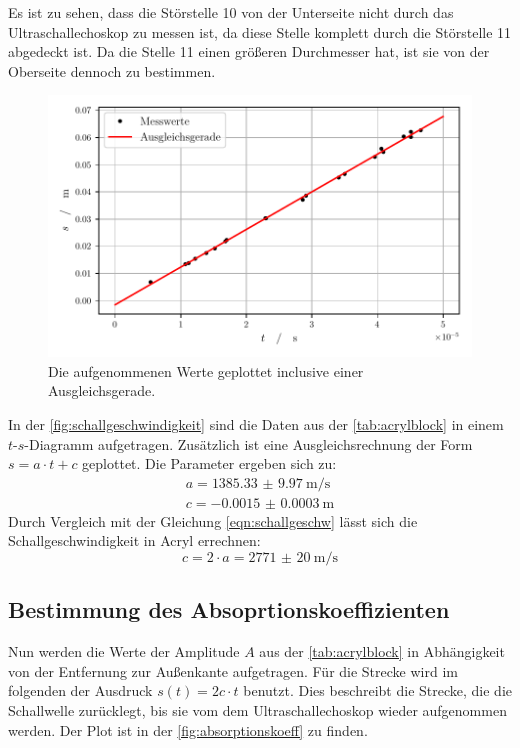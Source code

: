   \noindent Es ist zu sehen, dass die Störstelle 10 von der Unterseite nicht durch das Ultraschallechoskop zu messen ist, da diese Stelle komplett durch die 
  Störstelle 11 abgedeckt ist. Da die Stelle 11 einen größeren Durchmesser hat, ist sie von der Oberseite dennoch zu bestimmen. 

  \begin{figure}[H]
    \centering
    \includegraphics[width=\textwidth]{build/schallgeschwindigkeit.pdf}
    \caption{Die aufgenommenen Werte geplottet inclusive einer Ausgleichsgerade.}
    \label{fig:schallgeschwindigkeit}    
  \end{figure}

  \noindent In der \autoref{fig:schallgeschwindigkeit} sind die Daten aus der \autoref{tab:acrylblock} in einem $t$-$s$-Diagramm aufgetragen. Zusätzlich 
  ist eine Ausgleichsrechnung der Form $ s = a \cdot t + c $ geplottet. Die Parameter ergeben sich zu:
  \begin{align*}
    a = \SI{1385.33(997)}{\metre\per\second}\\
    c = \SI{-0.0015(3)}{\metre}
  \end{align*}
  Durch Vergleich mit der Gleichung \eqref{eqn:schallgeschw} lässt sich die Schallgeschwindigkeit in Acryl errechnen:
  \begin{equation*}
    c = 2 \cdot a = \SI{2771(20)}{\metre\per\second}
  \end{equation*}


\subsection{Bestimmung des Absoprtionskoeffizienten}

  Nun werden die Werte der Amplitude $A$ aus der \autoref{tab:acrylblock} in Abhängigkeit von der Entfernung zur Außenkante aufgetragen. Für die Strecke 
  wird im folgenden der Ausdruck $ s(t) = 2c \cdot t $ benutzt. Dies beschreibt die Strecke, die die Schallwelle zurücklegt, bis sie vom dem Ultraschallechoskop
  wieder aufgenommen werden. Der Plot ist in der \autoref{fig:absorptionskoeff} zu finden. 

